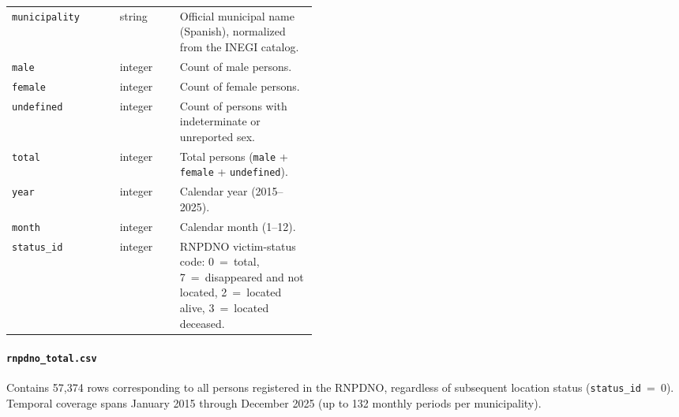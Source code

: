 \documentclass[3p]{elsarticle}
\begin{document}
\begin{table}[ht]
\begin{tabular}{llp{0.45\linewidth}}
    \texttt{municipality}& string & Official municipal name (Spanish),
                                    normalized from the INEGI catalog. \\
    \texttt{male}       & integer & Count of male persons. \\
    \texttt{female}     & integer & Count of female persons. \\
    \texttt{undefined}  & integer & Count of persons with indeterminate
                                    or unreported sex. \\
    \texttt{total}      & integer & Total persons
                                    (\texttt{male} + \texttt{female}
                                    + \texttt{undefined}). \\
    \texttt{year}       & integer & Calendar year (2015--2025). \\
    \texttt{month}      & integer & Calendar month (1--12). \\
    \texttt{status\_id} & integer & RNPDNO victim-status code:
                                    0~=~total, 7~=~disappeared and
                                    not located, 2~=~located alive,
                                    3~=~located deceased. \\
    \bottomrule
  \end{tabular}
\end{table}

\paragraph{\texttt{rnpdno\_total.csv}}
 Contains 57{,}374 rows corresponding to all persons registered in                                                                                                                         
  the RNPDNO, regardless of subsequent location status
  (\texttt{status\_id}~=~0).
  Temporal coverage spans January 2015 through December 2025                                                                                                                                  
  (up to 132 monthly periods per municipality).
                                                                                                                                                                                              
\end{document}
